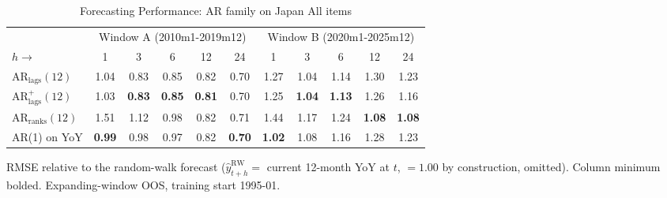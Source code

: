 \begin{table}[htbp]
\centering
\caption{Forecasting Performance: AR family on Japan All items}
\label{tab:ar_horizon}
\begin{tabular}{lcccccccccc}
\toprule
 & \multicolumn{5}{c}{Window A (2010m1-2019m12)} & \multicolumn{5}{c}{Window B (2020m1-2025m12)} \\
\cmidrule(lr){2-6} \cmidrule(lr){7-11}
$h \to$ & 1 & 3 & 6 & 12 & 24 & 1 & 3 & 6 & 12 & 24 \\
\midrule
$\text{AR}_{\text{lags}}(12)$ & 1.04 & 0.83 & 0.85 & 0.82 & 0.70 & 1.27 & 1.04 & 1.14 & 1.30 & 1.23 \\
$\text{AR}^{+}_{\text{lags}}(12)$ & 1.03 & \textbf{0.83} & \textbf{0.85} & \textbf{0.81} & 0.70 & 1.25 & \textbf{1.04} & \textbf{1.13} & 1.26 & 1.16 \\
$\text{AR}_{\text{ranks}}(12)$ & 1.51 & 1.12 & 0.98 & 0.82 & 0.71 & 1.44 & 1.17 & 1.24 & \textbf{1.08} & \textbf{1.08} \\
AR(1) on YoY & \textbf{0.99} & 0.98 & 0.97 & 0.82 & \textbf{0.70} & \textbf{1.02} & 1.08 & 1.16 & 1.28 & 1.23 \\
\bottomrule
\end{tabular}
\begin{tablenotes}\footnotesize\item RMSE relative to the random-walk forecast ($\hat{y}^{\text{RW}}_{t+h} = $ current 12-month YoY at $t$, $=1.00$ by construction, omitted). Column minimum bolded. Expanding-window OOS, training start 1995-01.\end{tablenotes}
\end{table}
